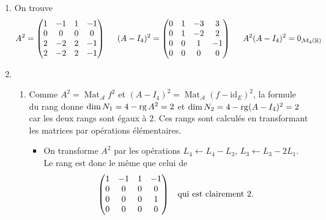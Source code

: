 \begin{enumerate}
 \item On trouve
\begin{displaymath}
 A^2=
\begin{pmatrix}
 1&-1&1&-1\\0&0&0&0\\2&-2&2&-1\\2&-2&2&-1
\end{pmatrix}
\hspace{0.5cm}
(A-I_4)^2=
\begin{pmatrix}
 0&1&-3&3\\0&1&-2&2\\0&0&1&-1\\0&0&0&0
\end{pmatrix}
\hspace{0.5cm}
A^2(A-I_4)^2=0_{\mathcal M_4(\mathbb{R})}
\end{displaymath}

 \item
\begin{enumerate}
 \item Comme $A^2=\mathop{\mathrm{Mat}}_{\mathcal A} f^2$ et $(A-I_4)^2=\mathop{\mathrm{Mat}}_{\mathcal A}(f-\mathrm{id}_E)^2$, la formule du rang donne $\dim N_1 = 4 -\operatorname{rg} A^2 = 2$ et $\dim N_2 = 4 -\operatorname{rg} (A-I_4)^2 = 2$ car les deux rangs sont égaux à $2$.\newline
Ces rangs sont calculés en transformant les matrices par opérations élémentaires.
\begin{itemize}
 \item On transforme $A^2$ par les opérations $L_4\leftarrow L_4 - L_3$, $L_3\leftarrow L_3 - 2L_1$. Le rang est donc le même que celui de
\begin{displaymath}
\begin{pmatrix}
 1&-1&1&-1\\0&0&0&0\\0&0&0&1\\0&0&0&0
\end{pmatrix}
\hspace{0.3cm} \text{qui est clairement $2$.}
\end{displaymath}


\end{itemize}
\end{enumerate}
\end{enumerate}
